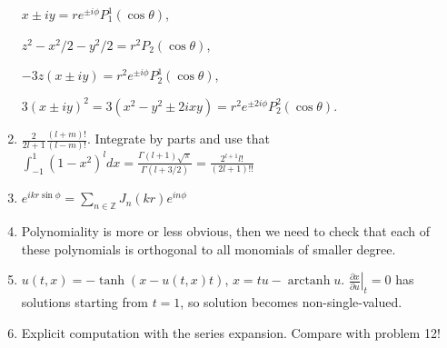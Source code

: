 \documentclass[a4paper,11pt]{article}
\begin{document}
\begin{enumerate}
\(x\pm iy=r e^{\pm i\phi} P_1^1(\cos\theta)\),

\(z^2-x^2/2-y^2/2=r^2 P_2(\cos\theta)\),

\(-3 z(x\pm iy)=r^2 e^{\pm i\phi} P_2^1(\cos\theta)\),

\(3 (x\pm iy)^2=3(x^2-y^2\pm 2ixy)=r^2e^{\pm 2i\phi}P_2^2(\cos\theta)\).

\item\label{item:56} \(\frac{2}{2l+1}\frac{(l+m)!}{(l-m)!}\). Integrate by parts and use that \(\int_{-1}^1(1-x^2)^ldx = \frac{\Gamma(l+1)\sqrt{\pi}}{\Gamma(l+3/2)}=\frac{2^{l+1}l!}{(2l+1)!!}\)

\item\label{item:57} \(e^{ikr\sin\phi}=\sum_{n\in \mathbb{Z}}J_n(kr)e^{in\phi}\)


\item\label{item:61} Polynomiality is more or less obvious, then we need to check that each of these polynomials is orthogonal to all monomials of smaller degree.

\item\label{item:59} \(u(t,x)=-\tanh(x-u(t,x)t)\), \(x=tu-\operatorname{arctanh} u\). \(\left.\frac{\partial x}{\partial u}\right|_t=0\) has solutions starting from \(t=1\), so solution becomes non-single-valued.

\item\label{item:60} Explicit computation with the series expansion. Compare with problem 12!

\end{enumerate}
\end{document}
